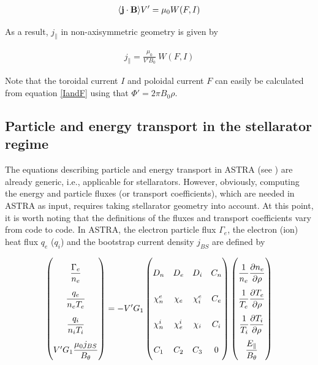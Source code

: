 \begin{eqnarray} \label{jpara1}
\langle \textbf{j}\cdot\mathbf{B} \rangle V' = \mu_0 W(F,I)
\end{eqnarray}

As a result, $j_\parallel$ in non-axisymmetric geometry is given by

\begin{eqnarray} \label{jpara1}
j_\parallel = \frac{\mu_0}{V'B_0} \ W(F,I)
\end{eqnarray}

Note that the toroidal current $I$ and poloidal current $F$ can easily be calculated from equation \ref{IandF} using that $\Phi'=2\pi B_0 \rho$.


\subsection{Particle and energy transport in the stellarator regime}

The equations describing particle and energy transport in ASTRA (see \cite{ASTRAmanual}) are already generic, i.e., applicable for stellarators. However, obviously, computing the energy and particle fluxes (or transport coefficients), which are needed in ASTRA as input, requires taking stellarator geometry into account. At this point, it is worth noting that the definitions of the fluxes and transport coefficients vary from code to code. In ASTRA, the electron particle flux $\Gamma_e$, the electron (ion) heat flux $q_e$ ($q_i$) and the bootstrap current density $j_{BS}$ are defined by \cite{ASTRAmanual}

\begin{equation}
    \label{eq:fluxesdef}
    \renewcommand*{\arraystretch}{2.5}
	\begin{pmatrix}
                \dfrac{\Gamma_e}{n_e} \\ \dfrac{q_e}{n_e T_e} \\ 	\dfrac{q_i}{n_i T_i} \\ V' G_1 \dfrac{\mu_0 j_{BS}}{B_\theta}
	\end{pmatrix} = - V' G_1 \begin{pmatrix}
D_n & D_e & D_i & C_n \\
\chi_n^e & \chi_e & \chi_i^e & C_e \\
\chi_n^i & \chi_e^i & \chi_i & C_i \\
C_1 & C_2 & C_3 & 0
	\end{pmatrix}
\begin{pmatrix}
\dfrac{1}{n_e} \dfrac{\partial n_e}{\partial \rho} \\
 \dfrac{1}{T_e} \dfrac{\partial T_e}{\partial \rho} \\
\dfrac{1}{T_i} \dfrac{\partial T_i}{\partial \rho} \\
\dfrac{E_\parallel}{B_\theta}
	\end{pmatrix}
\end{equation}

